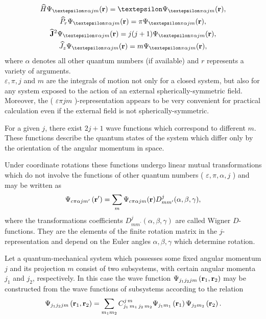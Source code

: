 \begin{equation}
\begin{gathered}
\widehat{H} \Psi_{\varepsilon \pi \alpha j m}(\vect r)=\varepsilon \Psi_{\varepsilon \pi \alpha j m}(\vect r), \\
\widehat{P}_{r} \Psi_{\varepsilon \pi \alpha j m}(\vect r)=\pi \Psi_{\varepsilon \pi \alpha j m}(\vect r), \\
\widehat{\vect{J}}^{2} \Psi_{\varepsilon \pi \alpha j m}(\vect r)=j(j+1) \Psi_{\varepsilon \pi \alpha j m}(\vect r), \\
\widehat{J}_{z} \Psi_{\varepsilon \pi \alpha j m}(\vect r)=m \Psi_{\varepsilon \pi \alpha j m}(\vect r),
\end{gathered}
\end{equation}
where $\alpha$ denotes all other quantum numbers (if available) and $r$ represents a variety of arguments.\\
$\varepsilon, \pi, j$ and $m$ are the integrals of motion not only for a closed system, but also for any system exposed to the action of an external spherically-symmetric field. Moreover, the ( $\varepsilon \pi j m$ )-representation appears to be very convenient for practical calculation even if the external field is not spherically-symmetric.

For a given $j$, there exist $2 j+1$ wave functions which correspond to different $m$. These functions describe the quantum states of the system which differ only by the orientation of the angular momentum in space.

Under coordinate rotations these functions undergo linear mutual transformations which do not involve the functions of other quantum numbers ( $\varepsilon, \pi, \alpha, j$ ) and may be written as
\begin{equation}
\Psi_{c \pi \alpha j m^{\prime}}\left(\mathbf{r}^{\prime}\right)=\sum_{m} \Psi_{c \pi \alpha j m}(\mathbf{r}) D_{m m^{\prime}}^{j}(\alpha, \beta, \gamma),
\end{equation}
where the transformations coefficients $D_{m m^{\prime}}^{j}(\alpha, \beta, \gamma)$ are called Wigner $D$-functions. They are the elements of the finite rotation matrix in the $j$-representation and depend on the Euler angles $\alpha, \beta, \gamma$ which determine rotation.

Let a quantum-mechanical system which possesses some fixed angular momentum $j$ and its projection $m$ consist of two subsystems, with certain angular momenta $j_{1}$ and $j_{2}$, respectively. In this case the wave function $\Psi_{j_{1} j_{2} j m}\left(\mathbf{r}_{1}, \mathbf{r}_{2}\right)$ may be constructed from the wave functions of subsystems according to the relation
\begin{equation}
\Psi_{j_{1} j_{2} j m}\left(\mathbf{r}_{1}, \mathbf{r}_{2}\right)=\sum_{m_{1} m_{2}} C_{j_{1}\,m_{1}\,j_{2}\,m_{2}}^{j\,m} \Psi_{j_{1} m_{1}}\left(\mathbf{r}_{1}\right) \Psi_{j_{2} m_{2}}\left(\mathbf{r}_{2}\right).
\end{equation}

